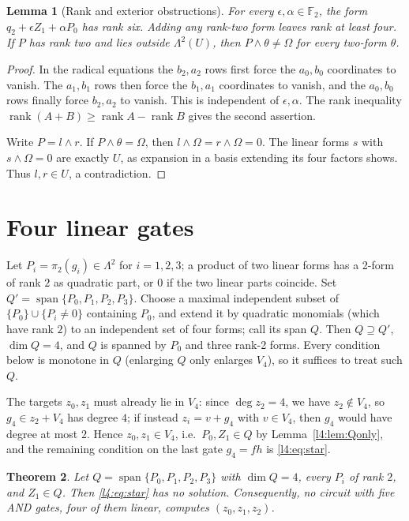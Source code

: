 \documentclass[11pt,a4paper]{article}
\theoremstyle{plain}
\newtheorem{theorem}{Theorem}
\newtheorem{lemma}[theorem]{Lemma}
\theoremstyle{remark}
\newcommand{\Span}{\operatorname{span}}
\newcommand{\rk}{\operatorname{rank}}
\newcommand{\Lam}{\Lambda^2}
\begin{document}
\begin{lemma}[Rank and exterior obstructions]\label{l2:lem:rankext}
For every $\epsilon,\alpha\in\mathbb F_2$, the form $q_2+\epsilon Z_1+\alpha P_0$ has rank six. Adding any rank-two form leaves rank at least four. If $P$ has rank two and lies outside $\Lambda^2(U)$, then $P\wedge\theta\ne\Omega$ for every two-form $\theta$.
\end{lemma}
\begin{proof}
In the radical equations the $b_2,a_2$ rows first force the $a_0,b_0$ coordinates to vanish. The $a_1,b_1$ rows then force the $b_1,a_1$ coordinates to vanish, and the $a_0,b_0$ rows finally force $b_2,a_2$ to vanish. This is independent of $\epsilon,\alpha$. The rank inequality $\rk(A+B)\ge\rk A-\rk B$ gives the second assertion.

Write $P=l\wedge r$. If $P\wedge\theta=\Omega$, then $l\wedge\Omega=r\wedge\Omega=0$. The linear forms $s$ with $s\wedge\Omega=0$ are exactly $U$, as expansion in a basis extending its four factors shows. Thus $l,r\in U$, a contradiction.
\end{proof}


\section{Four linear gates}\label{sec:lambda4}

Let $P_i=\pi_2(g_i)\in\Lam$ for $i=1,2,3$; a product of two linear forms has a 2-form of rank $2$ as quadratic part, or $0$ if the two linear parts coincide. Set $Q'=\Span\{P_0,P_1,P_2,P_3\}$. Choose a maximal independent subset of $\{P_0\}\cup\{P_i\ne0\}$ containing $P_0$, and extend it by quadratic monomials (which have rank $2$) to an independent set of four forms; call its span $Q$. Then $Q\supseteq Q'$, $\dim Q=4$, and $Q$ is spanned by $P_0$ and three rank-2 forms. Every condition below is monotone in $Q$ (enlarging $Q$ only enlarges $V_4$), so it suffices to treat such $Q$.


The targets $z_0,z_1$ must already lie in $V_4$: since $\deg z_2=4$, we have $z_2\notin V_4$, so $g_4\in z_2+V_4$ has degree $4$; if instead $z_i=v+g_4$ with $v\in V_4$, then $g_4$ would have degree at most $2$. Hence $z_0,z_1\in V_4$, i.e.\ $P_0,Z_1\in Q$ by Lemma~\ref{l4:lem:Qonly}, and the remaining condition on the last gate $g_4=fh$ is
\eqref{l4:eq:star}.


\begin{theorem}\label{l4:thm:main}
Let $Q=\Span\{P_0,P_1,P_2,P_3\}$ with $\dim Q=4$, every $P_i$ of rank $2$, and $Z_1\in Q$. Then \eqref{l4:eq:star} has no solution. Consequently, no circuit with five AND gates, four of them linear, computes $(z_0,z_1,z_2)$.
\end{theorem}
\end{document}
